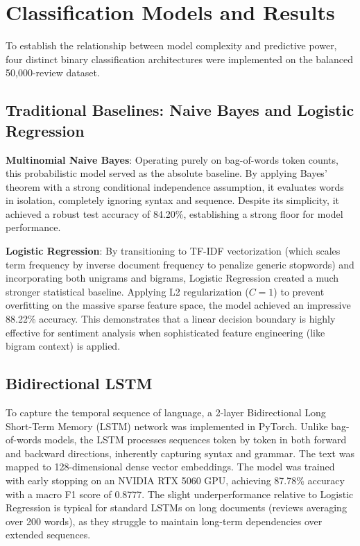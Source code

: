 \documentclass[conference]{IEEEtran}
\begin{document}
\section{Classification Models and Results}
To establish the relationship between model complexity and predictive power, four distinct binary classification architectures were implemented on the balanced 50,000-review dataset.

\subsection{Traditional Baselines: Naive Bayes and Logistic Regression}
\textbf{Multinomial Naive Bayes}: Operating purely on bag-of-words token counts, this probabilistic model served as the absolute baseline. By applying Bayes' theorem with a strong conditional independence assumption, it evaluates words in isolation, completely ignoring syntax and sequence. Despite its simplicity, it achieved a robust test accuracy of 84.20\%, establishing a strong floor for model performance.

\textbf{Logistic Regression}: By transitioning to TF-IDF vectorization (which scales term frequency by inverse document frequency to penalize generic stopwords) and incorporating both unigrams and bigrams, Logistic Regression created a much stronger statistical baseline. Applying L2 regularization ($C=1$) to prevent overfitting on the massive sparse feature space, the model achieved an impressive 88.22\% accuracy. This demonstrates that a linear decision boundary is highly effective for sentiment analysis when sophisticated feature engineering (like bigram context) is applied.

\subsection{Bidirectional LSTM}
To capture the temporal sequence of language, a 2-layer Bidirectional Long Short-Term Memory (LSTM) network was implemented in PyTorch. Unlike bag-of-words models, the LSTM processes sequences token by token in both forward and backward directions, inherently capturing syntax and grammar. The text was mapped to 128-dimensional dense vector embeddings. The model was trained with early stopping on an NVIDIA RTX 5060 GPU, achieving 87.78\% accuracy with a macro F1 score of 0.8777. The slight underperformance relative to Logistic Regression is typical for standard LSTMs on long documents (reviews averaging over 200 words), as they struggle to maintain long-term dependencies over extended sequences.
\end{document}
